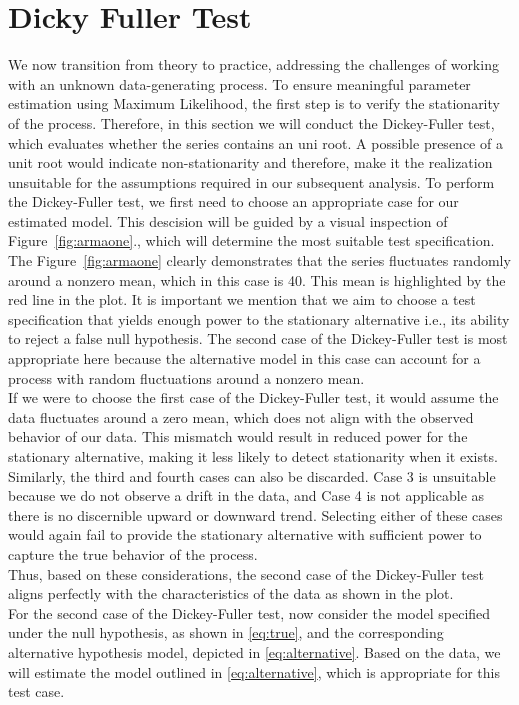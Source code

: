 \documentclass[12pt]{article}
\begin{document}
\section{Dicky Fuller Test}
We now transition from theory to practice, addressing the challenges of working with an unknown data-generating process. To ensure meaningful parameter estimation using Maximum Likelihood, the first step is to verify the stationarity of the process.
Therefore, in this section we will conduct the Dickey-Fuller test, which evaluates whether the series contains an uni root.
A possible presence of a unit root would indicate non-stationarity and therefore, make it the realization unsuitable for the assumptions required in our subsequent analysis.
To perform the Dickey-Fuller test, we first need to choose an appropriate case for our estimated model.
This descision will be guided by a visual inspection of Figure~\ref{fig:armaone}., which will determine the most suitable test specification.
The Figure~\ref{fig:armaone} clearly demonstrates that the series fluctuates randomly around a nonzero mean, which in this case is 40. This mean is highlighted by the red line in the plot.
It is important we mention that we aim to choose a test specification that yields enough power to the stationary alternative i.e., its ability to reject a false null hypothesis.
The second case of the Dickey-Fuller test is most appropriate here because the alternative model in this case can account for a process with random fluctuations around a nonzero mean. \\
If we were to choose the first case of the Dickey-Fuller test, it would assume the data fluctuates around a zero mean, which does not align with the observed behavior of our data.
 This mismatch would result in reduced power for the stationary alternative, making it less likely to detect stationarity when it exists.\\
Similarly, the third and fourth cases can also be discarded. Case 3 is unsuitable because we do not observe a drift in the data, and Case 4 is not applicable as there is no discernible upward or downward trend. Selecting either of these cases would again fail to provide the stationary alternative with sufficient power to capture the true behavior of the process.\\
Thus, based on these considerations, the second case of the Dickey-Fuller test aligns perfectly with the characteristics of the data as shown in the plot.\\
For the second case of the Dickey-Fuller test, now consider the model specified under the null hypothesis, as shown in \eqref{eq:true}, and the corresponding alternative hypothesis model, depicted in \eqref{eq:alternative}. Based on the data, we will estimate the model outlined in \eqref{eq:alternative}, which is appropriate for this test case.
\end{document}

